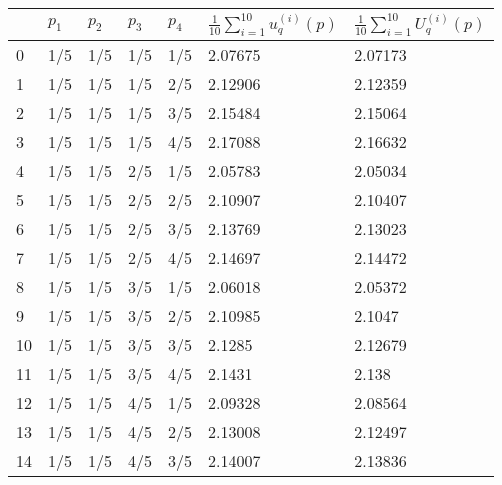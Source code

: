 \begin{tabular}{lllllll}
\toprule
{} & $p_1$ & $p_2$ & $p_3$ & $p_4$ & $\frac{1}{10} \sum \limits_{i = 1}^{10} u_q^{(i)} (p)$ & $\frac{1}{10} \sum\limits_{i = 1} ^{10} U_q^{(i)} (p)$ \\
\midrule
0  &   1/5 &   1/5 &   1/5 &   1/5 &                                            2.07675 &                                            2.07173 \\
1  &   1/5 &   1/5 &   1/5 &   2/5 &                                            2.12906 &                                            2.12359 \\
2  &   1/5 &   1/5 &   1/5 &   3/5 &                                            2.15484 &                                            2.15064 \\
3  &   1/5 &   1/5 &   1/5 &   4/5 &                                            2.17088 &                                            2.16632 \\
4  &   1/5 &   1/5 &   2/5 &   1/5 &                                            2.05783 &                                            2.05034 \\
5  &   1/5 &   1/5 &   2/5 &   2/5 &                                            2.10907 &                                            2.10407 \\
6  &   1/5 &   1/5 &   2/5 &   3/5 &                                            2.13769 &                                            2.13023 \\
7  &   1/5 &   1/5 &   2/5 &   4/5 &                                            2.14697 &                                            2.14472 \\
8  &   1/5 &   1/5 &   3/5 &   1/5 &                                            2.06018 &                                            2.05372 \\
9  &   1/5 &   1/5 &   3/5 &   2/5 &                                            2.10985 &                                             2.1047 \\
10 &   1/5 &   1/5 &   3/5 &   3/5 &                                             2.1285 &                                            2.12679 \\
11 &   1/5 &   1/5 &   3/5 &   4/5 &                                             2.1431 &                                              2.138 \\
12 &   1/5 &   1/5 &   4/5 &   1/5 &                                            2.09328 &                                            2.08564 \\
13 &   1/5 &   1/5 &   4/5 &   2/5 &                                            2.13008 &                                            2.12497 \\
14 &   1/5 &   1/5 &   4/5 &   3/5 &                                            2.14007 &                                            2.13836 \\
\bottomrule
\end{tabular}

